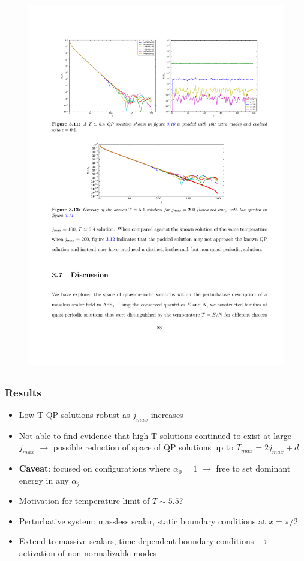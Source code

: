 \documentclass[mathserif,10pt]{beamer}
\newcommand{\bi}{\begin{itemize}}
\newcommand{\ei}{\end{itemize}}
\newcommand{\its}{\item}
\newcommand{\jm}{j_{max}}
\begin{document}
{\begin{overlayarea}{\textwidth}{0.65\textheight}
\begin{figure}
{      \includegraphics[scale=1.0]{TTFEvo}
      }
      \end{figure}
  \end{overlayarea}
}

\subsection*{}
\frame
{
  \frametitle{Results}
    \bi
    \its Low-T QP solutions robust as $\jm$ increases
    \its Not able to find evidence that high-T solutions continued to exist at large $\jm$ $\to$ possible reduction of space of QP solutions up to $T_{max} = 2\jm + d$
    \its {\bf Caveat}: focused on configurations where $\alpha_0 = 1$ $\to$ free to set dominant energy in any $\alpha_j$
    \its Motivation for temperature limit of $T \sim 5.5$?
    \its Perturbative system: massless scalar, static boundary conditions at $x = \pi/2$
    \its Extend to massive scalars, time-dependent boundary conditions $\to$ activation of non-normalizable modes
    \ei
}
\end{document}
